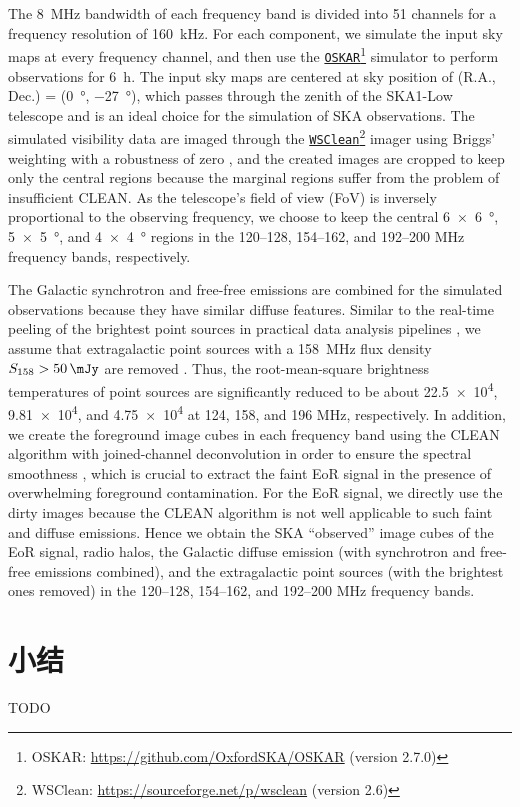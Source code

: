 The \SI{8}{\MHz} bandwidth of each frequency band is divided into 51
channels for a frequency resolution of \SI{160}{\kilo\hertz}.
For each component, we simulate the input sky maps at every frequency
channel, and then use the
\href{https://github.com/OxfordSKA/OSKAR}{\texttt{OSKAR}}\footnote{%
  OSKAR: \url{https://github.com/OxfordSKA/OSKAR} (version 2.7.0)}
simulator \cite{mort2010} to perform observations for \SI{6}{\hour}.
The input sky maps are centered at sky position of
(R.A., Dec.\@) = (\SI{0}{\degree}, \SI{-27}{\degree}),
which passes through the zenith of the SKA1-Low telescope and
is an ideal choice for the simulation of SKA observations.
The simulated visibility data are imaged through the
\href{https://sourceforge.net/p/wsclean}{\texttt{WSClean}}\footnote{%
  WSClean: \url{https://sourceforge.net/p/wsclean} (version 2.6)}
imager \cite{offringa2014} using Briggs' weighting with a
robustness of zero \cite{briggs1995},
and the created images are cropped to keep only the central regions
because the marginal regions suffer from the problem of insufficient
CLEAN.
As the telescope's field of view (FoV) is inversely proportional to
the observing frequency, we choose to keep the central
\SI{6 x 6}{\degree}, \SI{5 x 5}{\degree}, and \SI{4 x 4}{\degree}
regions in the \numrange{120}{128}, \numrange{154}{162}, and
\numrange{192}{200} \si{\MHz} frequency bands, respectively.

The Galactic synchrotron and free-free emissions are combined for the
simulated observations because they have similar diffuse features.
Similar to the real-time peeling of the brightest point sources in
practical data analysis pipelines
\cite{mitchell2008,intema2009,mort2017},
we assume that extragalactic point sources with a \SI{158}{\MHz} flux
density $S_{158} > \SI{50}{\mJy}$ are removed
\cite{liu2009ps,pindor2011}.
Thus, the root-mean-square brightness temperatures of point sources
are significantly reduced to be about
\num{22.5e4}, \num{9.81e4}, and \num{4.75e4} \si{\mK}
at 124, 158, and 196 \si{\MHz}, respectively.
In addition, we create the foreground image cubes in each frequency band
using the CLEAN algorithm with joined-channel deconvolution in order
to ensure the spectral smoothness \cite{offringa2017}, which is crucial
to extract the faint EoR signal in the presence of overwhelming
foreground contamination.
For the EoR signal, we directly use the dirty images because the CLEAN
algorithm is not well applicable to such faint and diffuse emissions.
Hence we obtain the SKA \enquote{observed} image cubes of the EoR signal,
radio halos, the Galactic diffuse emission (with synchrotron and
free-free emissions combined), and the extragalactic point sources
(with the brightest ones removed) in the \numrange{120}{128},
\numrange{154}{162}, and \numrange{192}{200} \si{\MHz} frequency bands.


\section{小结}

TODO


